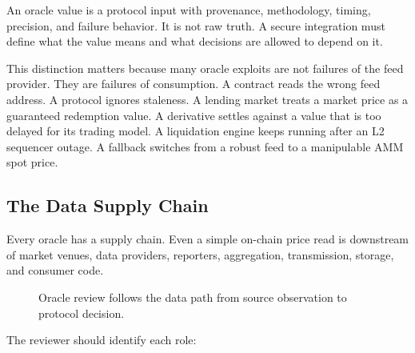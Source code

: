 \begin{definitionbox}
An oracle value is a protocol input with provenance, methodology, timing, precision, and failure behavior. It is not raw truth. A secure integration must define what the value means and what decisions are allowed to depend on it.
\end{definitionbox}

This distinction matters because many oracle exploits are not failures of the feed provider. They are failures of consumption. A contract reads the wrong feed address. A protocol ignores staleness. A lending market treats a market price as a guaranteed redemption value. A derivative settles against a value that is too delayed for its trading model. A liquidation engine keeps running after an L2 sequencer outage. A fallback switches from a robust feed to a manipulable AMM spot price.

\subsection{The Data Supply Chain}

Every oracle has a supply chain. Even a simple on-chain price read is downstream of market venues, data providers, reporters, aggregation, transmission, storage, and consumer code.

\begin{figure}[htbp]
\centering
{}
\caption{Oracle review follows the data path from source observation to protocol decision.}
\end{figure}

The reviewer should identify each role:

